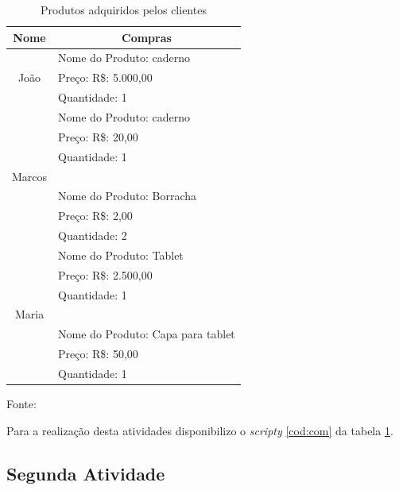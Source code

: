 \begin{table}[H]
  \caption{Produtos adquiridos pelos clientes}
  \center
  \begin{tabular}{ | c | c |}
      \hline
      \textbf{Nome} & \textbf{Compras} \\
      \hline
           &  \multicolumn{1}{l|}{Nome do Produto: caderno} \\
        João  & \multicolumn{1}{l|}{Preço: R\$: 5.000,00}  \\
          & \multicolumn{1}{l|}{Quantidade: 1 } \\
      \hline
           &  \multicolumn{1}{l|}{Nome do Produto: caderno} \\
          & \multicolumn{1}{l|}{Preço: R\$: 20,00}  \\
          & \multicolumn{1}{l|}{Quantidade: 1 } \\
        Marcos  & \\
          & \multicolumn{1}{l|}{Nome do Produto: Borracha} \\
          & \multicolumn{1}{l|}{Preço: R\$: 2,00} \\
          & \multicolumn{1}{l|}{Quantidade: 2} \\
      \hline
           &  \multicolumn{1}{l|}{Nome do Produto: Tablet} \\
          & \multicolumn{1}{l|}{Preço: R\$: 2.500,00}  \\
          & \multicolumn{1}{l|}{Quantidade: 1 } \\
        Maria  & \\
          & \multicolumn{1}{l|}{Nome do Produto: Capa para tablet} \\
          & \multicolumn{1}{l|}{Preço: R\$: 50,00} \\
          & \multicolumn{1}{l|}{Quantidade: 1} \\
      \hline

  \end{tabular}
  \label{tab:com}
  \flushleft %

  {\fontsize{10pt}{\baselineskip}\selectfont
    Fonte: }
\end{table}

\par Para a realização desta atividades disponibilizo o \textit{scripty} \ref{cod:com} da tabela \ref{tab:com}.




\subsection{Segunda Atividade}\label{2atividae}

